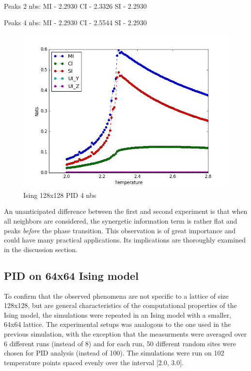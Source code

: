 \documentclass[12pt]{article}
\begin{document}
Peaks 2 nbs:
MI - 2.2930
CI - 2.3326
SI - 2.2930

Peaks 4 nbs:
MI - 2.2930
CI - 2.5544
SI - 2.2930

\begin{figure} [h!]
\begin{center}
\includegraphics[width=\textwidth]{ising-128-pid-4-nbs}
\caption{Ising 128x128 PID 4 nbs}
\label{fig:ising-128-pid-4-nbs}
\end{center}
\end{figure}

An unanticipated difference between the first and second experiment is that when all neighbors are considered, the synergetic information term is rather flat and peaks \textit{before} the phase transition. This observation is of great importance and could have many practical applications. Its implications are thoroughly examined in the discussion section. 

\subsection{PID on 64x64 Ising model}

To confirm that the observed phenomena are not specific to a lattice of size 128x128, but are general characteristics of the computational properties of the Ising model, the simulations were repeated in an Ising model with a smaller, 64x64 lattice. The experimental setups was analogous to the one used in the previous simulation, with the exception that the measurments were averaged over 6 different runs (instead of 8) and for each run, 50 different random sites were chosen for PID analysis (instead of 100). The simulations were run on 102 temperature points spaced evenly over the interval [2.0, 3.0]. 
\end{document}
